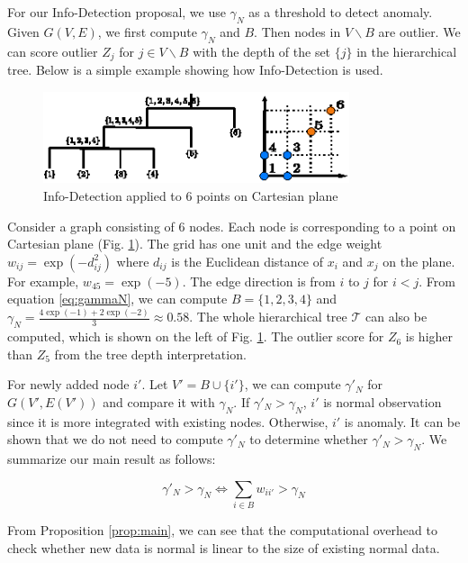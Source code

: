 \documentclass[runningheads]{llncs}
\begin{document}
For our Info-Detection proposal, we use $\gamma_N$ as a threshold to detect anomaly. Given $G(V, E)$, we first compute $\gamma_N$ and $B$. Then nodes in $V\backslash B$  are outlier. We can score outlier $Z_j$ for $j \in V\backslash B$ with the depth of the set $\{j\}$ in the hierarchical tree. Below is a simple example showing how Info-Detection is used.
\begin{example}
	\begin{figure}[!ht]
		\centering
		\includegraphics[width=9cm]{pic/outlier_example.eps}
		\caption{Info-Detection applied to 6 points on Cartesian plane}\label{fig:ex}
	\end{figure}
	Consider a graph consisting of 6 nodes. Each node is corresponding to a point on Cartesian plane (Fig. \ref{fig:ex}). The grid has one unit and the edge weight $w_{ij} = \exp(-d_{ij}^2)$ where $d_{ij}$ is the Euclidean distance of $x_i$ and $x_j$ on the plane. For example, $w_{45} = \exp(-5)$. The edge direction is from $i$ to $j$ for $i<j$. From equation \eqref{eq:gammaN}, we can compute $B=\{1,2,3,4\}$ and $\gamma_N = \frac{4\exp(-1)+2\exp(-2)}{3}\approx 0.58$. The whole hierarchical tree $\mathcal{T}$ can also be computed, which is shown on the left of Fig. \ref{fig:ex}. The outlier score for $Z_6$ is higher than $Z_5$ from the tree depth interpretation.
\end{example}
For newly added node $i'$. Let $V'=B\cup \{i'\}$, we can compute $\gamma'_N$ for $G(V', E(V'))$ and compare it with $\gamma_N$. If $\gamma'_N>\gamma_N$, $i'$ is normal observation since it is more integrated with existing nodes. Otherwise, $i'$ is anomaly. It can be shown that we do not need to compute $\gamma'_N$ to determine whether $\gamma'_N>\gamma_N$. We summarize our main result as follows:
\begin{proposition}\label{prop:main}
\begin{equation}
\gamma'_N > \gamma_N \iff  \sum_{i \in B} w_{ii'} > \gamma_N 
\end{equation}
\end{proposition}
From Proposition \ref{prop:main}, we can see that the computational overhead to check whether new data is normal is linear to the size of existing normal data. 
\end{document}
